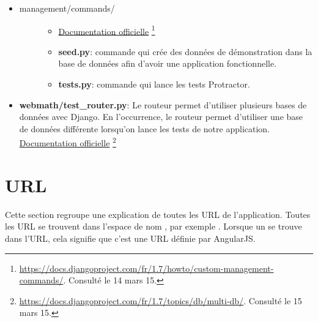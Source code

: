 \documentclass[a4paper,10pt,twoside]{sphinxmanual}
\begin{document}
\begin{itemize}
\item {} \begin{description}
\item[{management/commands/}] \leavevmode\begin{itemize}
\item {} 
\href{https://docs.djangoproject.com/fr/1.7/howto/custom-management-commands/}{Documentation officielle} \footnote{
\href{https://docs.djangoproject.com/fr/1.7/howto/custom-management-commands/}{https://docs.djangoproject.com/fr/1.7/howto/custom-management-commands/}. Consulté le 14 mars 15.
}

\item {} 
\textbf{seed.py}: commande qui crée des données de démonstration dans la base de données afin d'avoir une application fonctionnelle.

\item {} 
\textbf{tests.py}: commande qui lance les tests Protractor.

\end{itemize}

\end{description}

\item {} 
\textbf{webmath/test\_router.py}: Le routeur permet d'utiliser plusieurs bases de données avec Django. En l'occurrence, le routeur permet d'utiliser une base de données différente lorsqu'on lance les tests de notre application. \href{https://docs.djangoproject.com/fr/1.7/topics/db/multi-db/}{Documentation officielle} \footnote{
\href{https://docs.djangoproject.com/fr/1.7/topics/db/multi-db/}{https://docs.djangoproject.com/fr/1.7/topics/db/multi-db/}. Consulté le 15 mars 15.
}

\end{itemize}


\section{URL}
\label{guide:url}
Cette section regroupe une explication de toutes les URL de l'application. Toutes les URL se trouvent dans l'espace de nom , par exemple . Lorsque un \code{\#} se trouve dans l'URL, cela signifie que c'est une URL définie par AngularJS.
\end{document}
